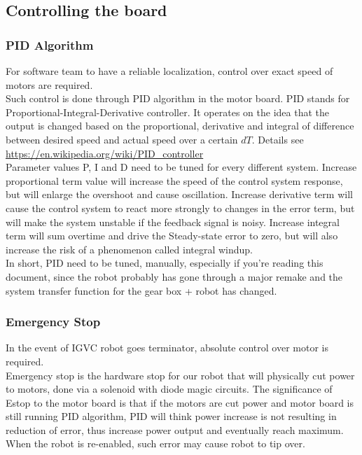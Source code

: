 \documentclass[letterpaper, 12pt]{article}
\begin{document}
\subsection{Controlling the board}
\subsubsection{PID Algorithm}
For software team to have a reliable localization, control over exact speed of motors are required.\\

Such control is done through PID algorithm in the motor board. PID stands for Proportional-Integral-Derivative controller. It operates on the idea that the output is changed based on the proportional, derivative and integral of difference between desired speed and actual speed over a certain $dT$. Details see \url{https://en.wikipedia.org/wiki/PID_controller}\\

Parameter values P, I and D need to be tuned for every different system. Increase proportional term value will increase the speed of the control system response, but will enlarge the overshoot and cause oscillation. Increase derivative term will cause the control system to react more strongly to changes in the error term, but will make the system unstable if the feedback signal is noisy. Increase integral term will sum overtime and drive the Steady-state error to zero, but will also increase the risk of a phenomenon called integral windup. \\

In short, PID need to be tuned, manually, especially if you're reading this document, since the robot probably has gone through a major remake and the system transfer function for the gear box + robot has changed.

\subsubsection{Emergency Stop}
In the event of IGVC robot goes terminator, absolute control over motor is required.\\

Emergency stop is the hardware stop for our robot that will physically cut power to motors, done via a solenoid with diode magic circuits. The significance of Estop to the motor board is that if the motors are cut power and motor board is still running PID algorithm, PID will think power increase is not resulting in reduction of error, thus increase power output and eventually reach maximum. When the robot is re-enabled, such error may cause robot to tip over. \\
\end{document}
